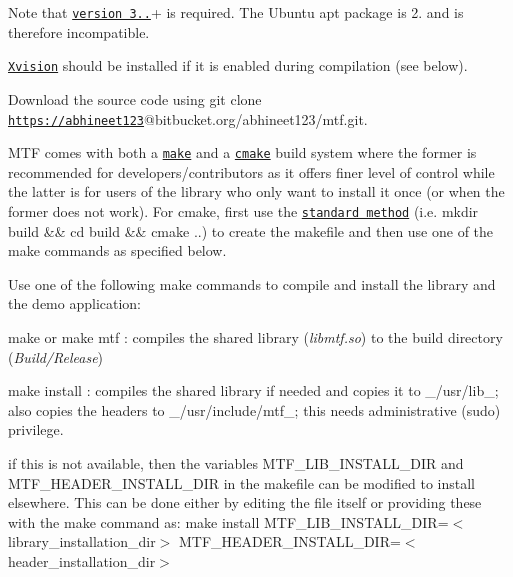 \begin{DoxyItemize}
\begin{DoxyItemize}
\begin{DoxyItemize}
\item Note that \href{http://gforge.inria.fr/frs/download.php/latestfile/475/visp-3.0.0.zip}{\tt version 3..}+ is required. The Ubuntu apt package is 2. and is therefore incompatible.
\end{DoxyItemize}
\item \href{https://bitbucket.org/abhineet123/xvision2}{\tt Xvision} should be installed if it is enabled during compilation (see below).
\end{DoxyItemize}
\item Download the source code using {\ttfamily git clone \href{https://abhineet123}{\tt https\-://abhineet123}@bitbucket.\-org/abhineet123/mtf.git}.
\item M\-T\-F comes with both a \href{https://www.gnu.org/software/make/}{\tt make} and a \href{https://cmake.org/}{\tt cmake} build system where the former is recommended for developers/contributors as it offers finer level of control while the latter is for users of the library who only want to install it once (or when the former does not work). For cmake, first use the \href{https://cmake.org/runningcmake/}{\tt standard method} (i.\-e. {\ttfamily mkdir build \&\& cd build \&\& cmake ..}) to create the makefile and then use one of the make commands as specified below.
\item Use one of the following make commands to compile and install the library and the demo application\-:
\begin{DoxyItemize}
\item {\ttfamily make} or {\ttfamily make mtf} \-: compiles the shared library ({\itshape libmtf.\-so}) to the build directory ({\itshape Build/\-Release})
\item {\ttfamily make install} \-: compiles the shared library if needed and copies it to \-\_\-/usr/lib\-\_\-; also copies the headers to \-\_\-/usr/include/mtf\-\_\-; this needs administrative (sudo) privilege.
\begin{DoxyItemize}
\item if this is not available, then the variables {\ttfamily M\-T\-F\-\_\-\-L\-I\-B\-\_\-\-I\-N\-S\-T\-A\-L\-L\-\_\-\-D\-I\-R} and {\ttfamily M\-T\-F\-\_\-\-H\-E\-A\-D\-E\-R\-\_\-\-I\-N\-S\-T\-A\-L\-L\-\_\-\-D\-I\-R} in the makefile can be modified to install elsewhere. This can be done either by editing the file itself or providing these with the make command as\-: {\ttfamily make install M\-T\-F\-\_\-\-L\-I\-B\-\_\-\-I\-N\-S\-T\-A\-L\-L\-\_\-\-D\-I\-R=$<$library\-\_\-installation\-\_\-dir$>$ M\-T\-F\-\_\-\-H\-E\-A\-D\-E\-R\-\_\-\-I\-N\-S\-T\-A\-L\-L\-\_\-\-D\-I\-R=$<$header\-\_\-installation\-\_\-dir$>$}

\end{DoxyItemize}
\end{DoxyItemize}
\end{DoxyItemize}
